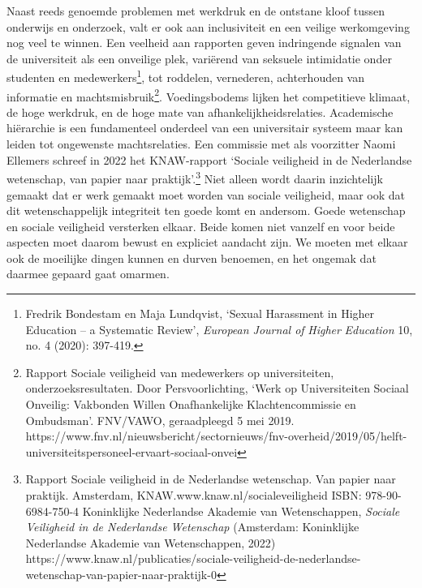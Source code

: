 \documentclass[smallauthor, chapterhaspagenum, nochapterinheader, pagenuminheader,  bigchapnum,medium2, tocpages,  garamond, titleinheader]{jote-book}
\begin{document}
	Naast reeds genoemde problemen met werkdruk en de ontstane kloof tussen onderwijs en onderzoek, valt er ook aan inclusiviteit en een veilige werkomgeving nog veel te winnen. Een veelheid aan rapporten geven indringende signalen van de universiteit als een onveilige plek, variërend van seksuele intimidatie onder studenten en medewerkers\footnote{Fredrik Bondestam en Maja Lundqvist, ‘Sexual Harassment in Higher Education -- a Systematic Review', \emph{European Journal of }\emph{Higher}\emph{ }\emph{Education} 10, no. 4 (2020): 397-419.}, tot roddelen, vernederen, achterhouden van informatie en machtsmisbruik\footnote{Rapport Sociale veiligheid van medewerkers op universiteiten, onderzoeksresultaten. Door Persvoorlichting, ‘Werk op Universiteiten Sociaal Onveilig: Vakbonden Willen Onafhankelijke Klachtencommissie en Ombudsman'. FNV/VAWO, geraadpleegd 5 mei 2019. https://www.fnv.nl/nieuwsbericht/sectornieuws/fnv-overheid/2019/05/helft-universiteitspersoneel-ervaart-sociaal-onvei}. Voedingsbodems lijken het competitieve klimaat, de hoge werkdruk, en de hoge mate van afhankelijkheidsrelaties. Academische hiërarchie is een fundamenteel onderdeel van een universitair systeem maar kan leiden tot ongewenste machtsrelaties. Een commissie met als voorzitter Naomi Ellemers schreef in 2022 het KNAW-rapport ‘Sociale veiligheid in de Nederlandse wetenschap, van papier naar praktijk'.\footnote{Rapport Sociale veiligheid in de Nederlandse wetenschap. Van papier naar praktijk. Amsterdam, KNAW.www.knaw.nl/socialeveiligheid ISBN: 978-90-6984-750-4 Koninklijke Nederlandse Akademie van Wetenschappen, \emph{Sociale Veiligheid in de Nederlandse Wetenschap} (Amsterdam: Koninklijke Nederlandse Akademie van Wetenschappen, 2022) https://www.knaw.nl/publicaties/sociale-veiligheid-de-nederlandse-wetenschap-van-papier-naar-praktijk-0} Niet alleen wordt daarin inzichtelijk gemaakt dat er werk gemaakt moet worden van sociale veiligheid, maar ook dat dit wetenschappelijk integriteit ten goede komt en andersom. Goede wetenschap en sociale veiligheid versterken elkaar. Beide komen niet vanzelf en voor beide aspecten moet daarom bewust en expliciet aandacht zijn. We moeten met elkaar ook de moeilijke dingen kunnen en durven benoemen, en het ongemak dat daarmee gepaard gaat omarmen.
\end{document}
